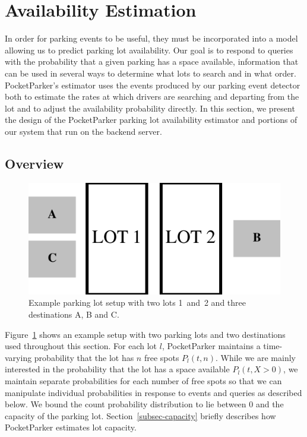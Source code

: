 \clearpage
\newpage

\section{Availability Estimation}
\label{sec-model}

In order for parking events to be useful, they must be incorporated into a
model allowing us to predict parking lot availability. Our goal is to respond
to queries with the probability that a given parking has a space available,
information that can be used in several ways to determine what lots to search
and in what order. PocketParker's estimator uses the events produced by our
parking event detector both to estimate the rates at which drivers are
searching and departing from the lot and to adjust the availability
probability directly. In this section, we present the design of the
PocketParker parking lot availability estimator and portions of our system
that run on the backend server.

\subsection{Overview}

\begin{figure}
\centering
\includegraphics[width=\columnwidth]{./figures/CartoonLot.pdf}

\caption{Example parking lot setup with two lots 1~and~2 and three
destinations A, B and C.}

\label{fig-lots}
\end{figure}

Figure~\ref{fig-lots} shows an example setup with two parking lots and two
destinations used throughout this section. For each lot $l$, PocketParker
maintains a time-varying probability that the lot has $n$ free spots $P_l(t,
n)$. While we are mainly interested in the probability that the lot has a
space available $P_l(t, X > 0)$, we maintain separate probabilities for each
number of free spots so that we can manipulate individual probabilities in
response to events and queries as described below. We bound the count
probability distribution to lie between 0 and the capacity of the parking
lot. Section~\ref{subsec-capacity} briefly describes how PocketParker
estimates lot capacity.

